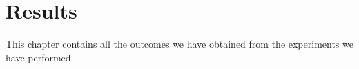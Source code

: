 \chapter{Results}\label{ch:results}
This chapter contains all the outcomes we have obtained from the experiments we have performed. 
